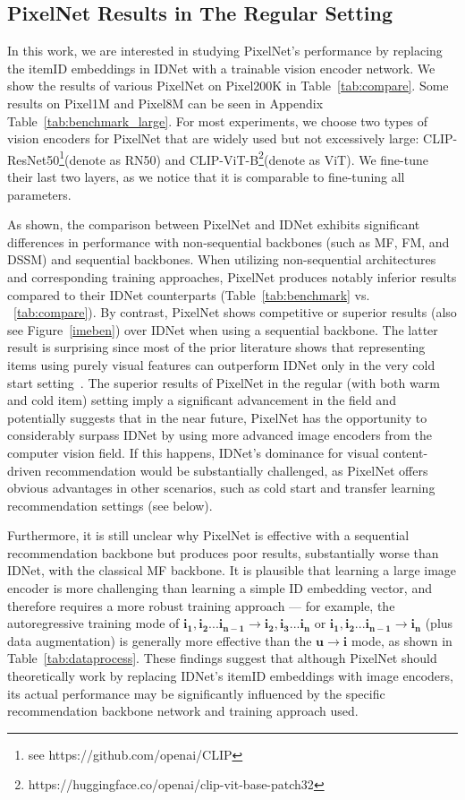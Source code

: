 \documentclass[sigconf]{acmart}
\begin{document}
\subsection{PixelNet Results in The Regular Setting}
In this work, we are interested in studying PixelNet's performance by replacing the itemID embeddings in IDNet with a trainable vision encoder network.
We show the results of various PixelNet on Pixel200K  in Table~\ref{tab:compare}.  Some  results on Pixel1M and Pixel8M can be seen in Appendix Table~\ref{tab:benchmark_large}. 
For most experiments, we choose  two types of vision encoders for PixelNet that are widely used but not excessively large:  CLIP-ResNet50\footnote{see https://github.com/openai/CLIP}(denote as RN50) and CLIP-ViT-B\footnote{https://huggingface.co/openai/clip-vit-base-patch32}(denote as ViT).
We fine-tune their last two layers, as we notice that it is comparable to fine-tuning all parameters.

As shown, the comparison between PixelNet and IDNet exhibits significant differences in performance with non-sequential backbones (such as MF, FM, and DSSM) and sequential backbones. When utilizing  non-sequential architectures and corresponding training approaches,  PixelNet produces notably inferior results compared to their IDNet counterparts (Table~\ref{tab:benchmark} vs. ~\ref{tab:compare}). By contrast,  PixelNet shows  competitive or superior results (also see Figure~\ref{imeben}) over  IDNet when  using a sequential backbone.
The latter result is   surprising since  most of the prior literature shows that representing items  using purely visual features can outperform IDNet only in the very cold start setting~\cite{yuan2023go,du2020learn}. 
The superior results of PixelNet in the regular (with both warm and cold item) setting imply a significant advancement in the field  and potentially suggests that in the near future, PixelNet has the opportunity to considerably surpass IDNet by using more advanced image encoders from the computer vision field. If this happens, IDNet's dominance for visual content-driven recommendation would be substantially challenged, as PixelNet offers obvious advantages in other  scenarios, such as cold start and transfer learning recommendation settings (see below).

Furthermore, it is still unclear why PixelNet is effective with a sequential recommendation backbone but produces poor results, substantially worse than IDNet, with the classical MF backbone. It is plausible that learning a large image encoder is more challenging than learning a simple ID embedding vector, and therefore requires a more robust training approach --- for example, the autoregressive training mode of $\mathbf{i_1}, \mathbf{i_2} ... \mathbf{i_{n-1}} \rightarrow \mathbf{i_2}, \mathbf{i_3}...\mathbf{i_n}$ or $\mathbf{i_1}, \mathbf{i_2} ... \mathbf{i_{n-1}} \rightarrow \mathbf{i_n}$ (plus data augmentation) is generally  more effective than  the $\mathbf{u} \rightarrow\mathbf{i}$ mode, as shown in Table~\ref{tab:dataprocess}. These findings suggest that although PixelNet should theoretically work by replacing IDNet's itemID embeddings with image encoders, its actual performance may be significantly influenced by the specific recommendation backbone network and training approach used. 
 
\end{document}
